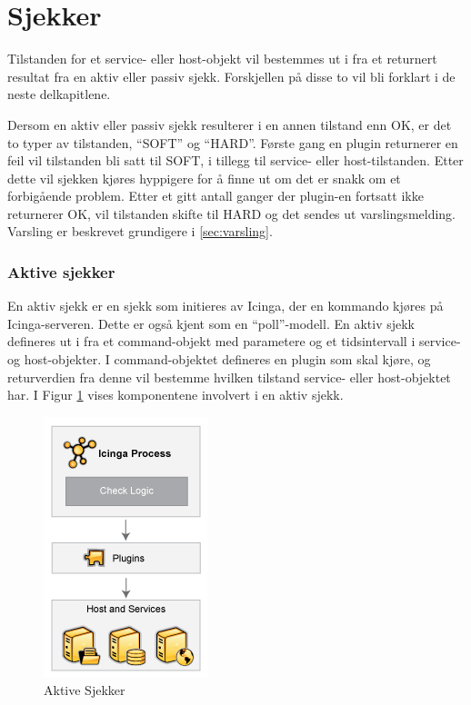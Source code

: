 \section{Sjekker}\label{sec:sjekker}
Tilstanden for et service- eller host-objekt vil bestemmes ut i fra et returnert resultat fra en aktiv eller passiv sjekk. Forskjellen på disse to vil bli forklart i de neste delkapitlene.

Dersom en aktiv eller passiv sjekk resulterer i en annen tilstand enn OK, er det to typer av tilstanden, ``SOFT'' og ``HARD''. Første gang en plugin returnerer en feil vil tilstanden bli satt til SOFT, i tillegg til service- eller host-tilstanden. Etter dette vil sjekken kjøres hyppigere for å finne ut om det er snakk om et forbigående problem. Etter et gitt antall ganger der plugin-en fortsatt ikke returnerer OK, vil tilstanden skifte til HARD og det sendes ut varslingsmelding. Varsling er beskrevet grundigere i \ref{sec:varsling}.

\clearpage
\subsubsection{Aktive sjekker}
En aktiv sjekk er en sjekk som initieres av Icinga, der en kommando kjøres på Icinga-serveren. Dette er også kjent som en ``poll''-modell. En aktiv sjekk defineres ut i fra et command-objekt med parametere og et tidsintervall i service- og host-objekter. I command-objektet defineres en plugin som skal kjøre, og returverdien fra denne vil bestemme hvilken tilstand service- eller host-objektet har. I Figur \ref{active_checks} vises komponentene involvert i en aktiv sjekk.
\begin{figure}
   \centering 
   \includegraphics[scale=0.7]{img/activechecks.png}
    \caption{Aktive Sjekker}
    \label{active_checks}
\end{figure}

